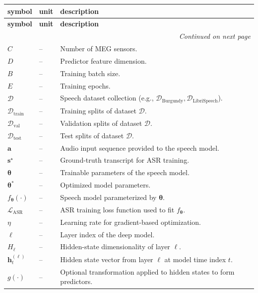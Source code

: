 \documentclass[12pt]{article}
\begin{document}
\renewcommand{\arraystretch}{1.15}
\noindent \begin{longtable}{l l p{11.2cm}}
\toprule
\textbf{symbol} & \textbf{unit} & \textbf{description}\\
\midrule
\endfirsthead
\toprule
\textbf{symbol} & \textbf{unit} & \textbf{description}\\
\midrule
\endhead
\midrule
\multicolumn{3}{r}{\emph{Continued on next page}}\\
\endfoot
\bottomrule
\endlastfoot

$C$ & -- & Number of MEG sensors.\\
$D$ & -- & Predictor feature dimension.\\
$B$ & -- & Training batch size. \\
$E$ & -- & Training epochs. \\
$\mathcal{D}$ & -- & Speech dataset collection (e.g., $\mathcal{D}_{\text{Burgundy}}, \mathcal{D}_{\text{LibriSpeech}}$).\\
$\mathcal{D}_{\text{train}}$ & -- & Training splits of dataset $\mathcal{D}$.\\
$\mathcal{D}_{\text{val}}$ & -- & Validation splits of dataset $\mathcal{D}$.\\
$\mathcal{D}_{\text{test}}$ & -- & Test splits of dataset $\mathcal{D}$.\\
$\boldsymbol{a}$ & -- & Audio input sequence provided to the speech model.\\
$\boldsymbol{s}^\star$ & -- & Ground-truth transcript for ASR training.\\
$\boldsymbol{\theta}$ & -- & Trainable parameters of the speech model.\\
$\boldsymbol{\theta}^\ast$ & -- & Optimized model parameters.\\
$f_{\boldsymbol{\theta}}(\cdot)$ & -- & Speech model parameterized by $\boldsymbol{\theta}$.\\
$\mathcal{L}_{\mathrm{ASR}}$ & -- & ASR training loss function used to fit $f_{\boldsymbol{\theta}}$.\\
$\eta$ & -- & Learning rate for gradient-based optimization.\\
$\ell$ & -- & Layer index of the deep model.\\
$H_\ell$ & -- & Hidden-state dimensionality of layer $\ell$.\\
$\boldsymbol{h}^{(\ell)}_t$ & -- & Hidden state vector from layer $\ell$ at model time index $t$.\\
$g(\cdot)$ & -- & Optional transformation applied to hidden states to form predictors.\\

\end{longtable}
\end{document}
